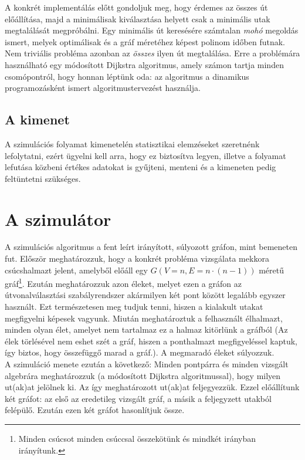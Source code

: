       A konkrét implementálás előtt gondoljuk meg, hogy érdemes az összes út előállítása, majd a minimálisak kiválasztása helyett csak a minimális utak megtalálását megpróbálni. Egy minimális út keresésére számtalan \textit{mohó} megoldás ismert, melyek optimálisak és a gráf méretéhez képest polinom időben futnak. Nem triviális probléma azonban az \textit{összes} ilyen út megtalálása. Erre a problémára használható egy módosított Dijkstra algoritmus, amely számon tartja minden csomópontról, hogy honnan léptünk oda: az algoritmus a dinamikus programozásként ismert algoritmustervezést használja.

    \subsection{A kimenet}
    A szimulációs folyamat kimenetelén statisztikai elemzéseket szeretnénk lefolytatni, ezért ügyelni kell arra, hogy ez biztosítva legyen, illetve a folyamat lefutása közbeni értékes adatokat is gyűjteni, menteni és a kimeneten pedig feltüntetni szükséges.\newpage

  \section{A szimulátor}\label{section_simulator}
  A szimulációs algoritmus a fent leírt irányított, súlyozott gráfon, mint bemeneten fut. Először meghatározzuk, hogy a konkrét probléma vizsgálata mekkora csúcshalmazt jelent, amelyből előáll egy $G(V=n, E=n \cdot (n-1))$ méretű gráf\footnote{Minden csúcsot minden csúccsal összekötünk és mindkét irányban irányítunk.}. Ezután meghatározzuk azon éleket, melyet ezen a gráfon az útvonalválasztási szabályrendszer akármilyen két pont között legalább egyszer használt. Ezt természetesen meg tudjuk tenni, hiszen a kialakult utakat megfigyelni képesek vagyunk. Miután meghatároztuk a felhasznált élhalmazt, minden olyan élet, amelyet nem tartalmaz ez a halmaz kitörlünk a gráfból (Az élek törlésével nem eshet szét a gráf, hiszen a ponthalmazt megfigyeléssel kaptuk, így biztos, hogy összefüggő marad a gráf.). A megmaradó éleket súlyozzuk.\\

  A szimuláció menete ezután a következő: Minden pontpárra és minden vizsgált algebrára meghatározzuk (a módosított Dijkstra algoritmussal), hogy milyen ut(ak)at jelölnek ki. Az így meghatározott ut(ak)at feljegyezzük. Ezzel előállítunk két gráfot: az első az eredetileg vizsgált gráf, a másik a feljegyzett utakból felépülő. Ezután ezen két gráfot hasonlítjuk össze.

